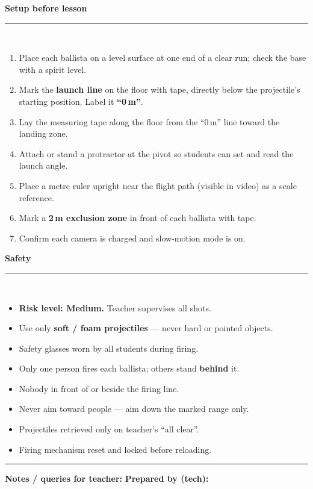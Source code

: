 \documentclass[11pt,a4paper]{article}
\newcommand{\sechead}[1]{%
  \vspace{0pt}%
  {\bfseries\large\color{HeadGrey} #1}\\[-2pt]
  {\color{RuleGrey}\rule{\linewidth}{0.8pt}}\\[1pt]
}
\begin{document}
\begin{minipage}[t]{0.50\linewidth}
\sechead{Setup before lesson}
\begin{enumerate}[itemsep=0pt, leftmargin=1.4em, topsep=0pt]
  \item Place each ballista on a level surface at one end of a clear run; check the base with a spirit level.
  \item Mark the \textbf{launch line} on the floor with tape, directly below the projectile's starting position. Label it \textbf{``0\,m''}.
  \item Lay the measuring tape along the floor from the ``0\,m'' line toward the landing zone.
  \item Attach or stand a protractor at the pivot so students can set and read the launch angle.
  \item Place a metre ruler upright near the flight path (visible in video) as a scale reference.
  \item Mark a \textbf{2\,m exclusion zone} in front of each ballista with tape.
  \item Confirm each camera is charged and slow-motion mode is on.
\end{enumerate}
\end{minipage}
\hfill
\begin{minipage}[t]{0.46\linewidth}
\sechead{Safety}
\begin{itemize}[itemsep=0pt, leftmargin=1.4em, topsep=0pt, label=\textbullet]
  \item \textbf{Risk level: Medium.} Teacher supervises all shots.
  \item Use only \textbf{soft / foam projectiles} --- never hard or pointed objects.
  \item Safety glasses worn by all students during firing.
  \item Only one person fires each ballista; others stand \textbf{behind} it.
  \item Nobody in front of or beside the firing line.
  \item Never aim toward people --- aim down the marked range only.
  \item Projectiles retrieved only on teacher's ``all clear''.
  \item Firing mechanism reset and locked before reloading.
\end{itemize}
\end{minipage}


\vspace{4pt}
{\color{RuleGrey}\rule{\linewidth}{0.8pt}}
{\footnotesize
\textbf{Notes / queries for teacher:} \underline{\hspace{7.5cm}}
\hfill \textbf{Prepared by (tech):} \underline{\hspace{3.5cm}}}
\end{document}
